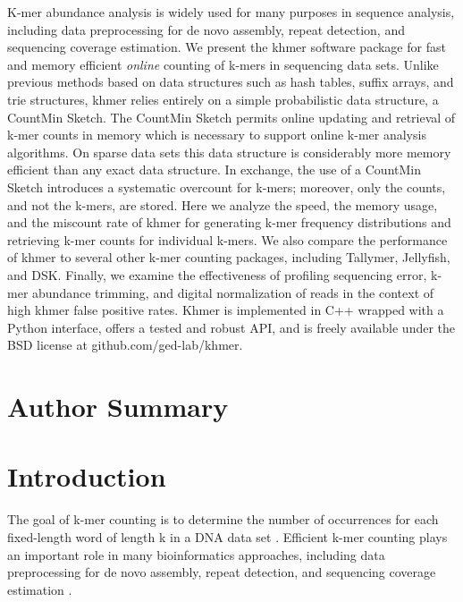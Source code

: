 \documentclass[10pt]{article}
\begin{document}
K-mer abundance analysis is widely used for many purposes in sequence
analysis, including data preprocessing for de novo assembly, repeat
detection, and sequencing coverage estimation.  We present the khmer
software package for fast and memory efficient {\em online} counting
of k-mers in sequencing data sets. Unlike previous methods based on
data structures such as hash tables, suffix arrays, and trie
structures, khmer relies entirely on a simple probabilistic data
structure, a CountMin Sketch.  The CountMin Sketch permits online
updating and retrieval of k-mer counts in memory which is necessary to
support online k-mer analysis algorithms.  On sparse data sets this
data structure is considerably more memory efficient than any exact
data structure.  In exchange, the use of a CountMin Sketch introduces
a systematic overcount for k-mers; moreover, only the counts, and not
the k-mers, are stored.  Here we analyze the speed, the memory usage,
and the miscount rate of khmer for generating k-mer frequency
distributions and retrieving k-mer counts for individual k-mers.  We
also compare the performance of khmer to several other k-mer counting
packages, including Tallymer, Jellyfish, and DSK.  Finally, we examine
the effectiveness of profiling sequencing error, k-mer abundance
trimming, and digital normalization of reads in the context of high
khmer false positive rates. Khmer is implemented in C++ wrapped with a Python
interface, offers a tested and robust API, and is freely available
under the BSD license at github.com/ged-lab/khmer.

\section*{Author Summary}

\section*{Introduction}

The goal of k-mer counting is to determine the number of occurrences
for each fixed-length word of length k in a DNA data set
\cite{Marcais2011}. Efficient k-mer counting plays an important role
in many bioinformatics approaches, including data preprocessing for de
novo assembly, repeat detection, and sequencing coverage estimation
\cite{Kurtz2008}.
\end{document}
